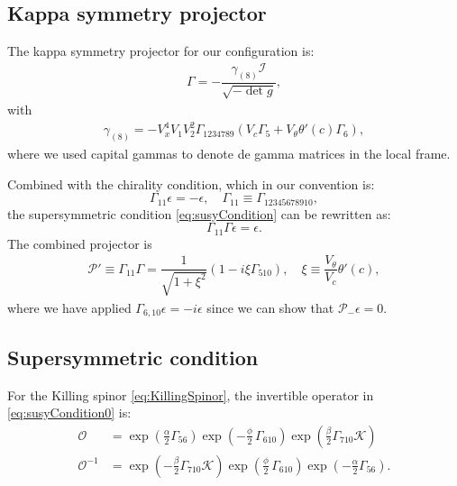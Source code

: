 

\subsection{Kappa symmetry projector}

The kappa symmetry projector for our configuration is:
\begin{align}
\Gamma = - \dfrac{ \gamma_{(8)} \mathcal{I} }{\sqrt{-\det g}},
\end{align}
with
\begin{align}
 \gamma_{(8)} = - V_x^4 V_1 V_2^2 \Gamma_{1 2 3 4 7 8 9}( V_c \Gamma_5 +  V_{\theta} \theta'(c) \Gamma_6), 
\end{align}
where we used capital gammas to denote de gamma matrices in the local frame. 

Combined with the chirality condition, which in our convention is: 
\begin{equation}
 \Gamma_{11} \epsilon = -\epsilon, \quad 
 \Gamma_{11} \equiv \Gamma_{12345678910},
\end{equation}
the supersymmetric condition \eqref{eq:susyCondition} can be rewritten as:
\begin{equation}
 \Gamma_{11} \Gamma \epsilon = \epsilon.
\end{equation}
The combined projector is
\begin{align} \label{eq:newProjector}
  \mathcal{P}' \equiv \Gamma_{11} \Gamma  = \dfrac{1}{\sqrt{1+\xi^2}}(1- i \xi  \Gamma_{510}), \quad 
   \xi \equiv  \dfrac{V_\theta}{V_c} \theta'(c),
\end{align}
where we have applied $\Gamma_{6,10} \epsilon = -i \epsilon$ since we can show that $\mathcal{P}_- \epsilon =0$. 

\subsection{Supersymmetric condition}

For the Killing spinor \eqref{eq:KillingSpinor}, the invertible operator in \eqref{eq:susyCondition0} is:
\begin{align}
 \mathcal{O} &= \exp{\left(\frac{\alpha}{2}\Gamma_{56} \right)} \exp{\left(-\frac{\phi}{2}\, \Gamma_{610} \right)} \exp{\left(\frac{\beta}{2}\Gamma_{710} \mathcal{K} \right)} \\
 \mathcal{O}^{-1} &=  \exp{\left(-\frac{\beta}{2}\Gamma_{710} \mathcal{K} \right)} 
 \exp{\left(\frac{\phi}{2}\, \Gamma_{610} \right)} 
 \exp{\left(-\frac{\alpha}{2}\Gamma_{56} \right)}.
\end{align}


